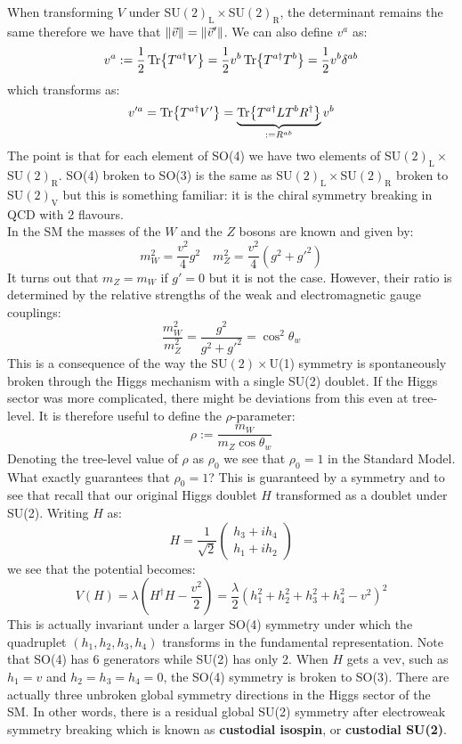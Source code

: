 \documentclass[../main.tex]{subfiles}
\begin{document}
When transforming $V$ under SU$(2)_{\text{L}}\times$SU$(2)_{\text{R}}$, the determinant remains the same therefore we have that $\norm{\Vec{v}}=\norm{\Vec{v}'}$. We can also define $v^a$ as:
\[
v^a:=\frac{1}{2}\Tr{T^{a\dagger}V}=\frac{1}{2}v^b\Tr{T^{a\dagger}T^b}=\frac{1}{2}v^b\delta^{ab}
\]
which transforms as:
\[
v'^a=\Tr{T^{a\dagger}V'}=\underbrace{\Tr{T^{a\dagger}LT^bR^\dagger}}_{:=R^{ab}}v^b
\]
The point is that for each element of SO(4) we have two elements of SU$(2)_{\text{L}}\times$SU$(2)_{\text{R}}$. SO(4) broken to SO(3) is the same as SU$(2)_{\text{L}}\times$SU$(2)_{\text{R}}$ broken to SU$(2)_{\text{V}}$ but this is something familiar: it is the chiral symmetry breaking in QCD with 2 flavours.\\
In the SM the masses of the $W$ and the $Z$ bosons are known and given by:
\[
m_W^2=\frac{v^2}{4}g^2 \quad m_Z^2=\frac{v^2}{4}(g^2+g'^2)
\]
It turns out that $m_Z=m_W$ if $g'=0$ but it is not the case. However, their ratio is determined by the relative strengths of the weak and electromagnetic gauge couplings:
\[
\frac{m_W^2}{m_Z^2}=\frac{g^2}{g^2+g'^2}=\cos^2\theta_w
\]
This is a consequence of the way the SU$(2)\times$U(1) symmetry is spontaneously broken through the Higgs mechanism with a single SU(2) doublet. If the Higgs sector was more complicated, there might be deviations from this even at tree-level. It is therefore useful to define the $\rho$-parameter:
\[
\rho:=\frac{m_W}{m_Z\cos\theta_w}
\]
Denoting the tree-level value of $\rho$ as $\rho_0$ we see that $\rho_0=1$ in the Standard Model. What exactly guarantees that $\rho_0=1$? This is guaranteed by a symmetry and to see that recall that our original Higgs doublet $H$ transformed as a doublet under SU(2). Writing $H$ as:
\[
H=\frac{1}{\sqrt{2}}\begin{pmatrix}h_3+ih_4\\h_1+ih_2\end{pmatrix}
\]
we see that the potential becomes:
\[
V(H)=\lambda\left(H^\dagger H-\frac{v^2}{2}\right)=\frac{\lambda}{2}\left(h_1^2+h_2^2+h_3^2+h_4^2-v^2\right)^2
\]
This is actually invariant under a larger SO(4) symmetry under which the quadruplet $(h_1,h_2,h_3,h_4)$ transforms in the fundamental representation. Note that SO(4) has 6 generators while SU(2) has only 2. When $H$ gets a vev, such as $h_1=v$ and $h_2=h_3=h_4=0$, the SO(4) symmetry is broken to SO(3). There are actually three unbroken global symmetry directions in the Higgs sector of the SM. In other words, there is a residual global SU(2) symmetry after electroweak symmetry breaking which is known as \textbf{custodial isospin}, or \textbf{custodial SU(2)}.\\
\end{document}
